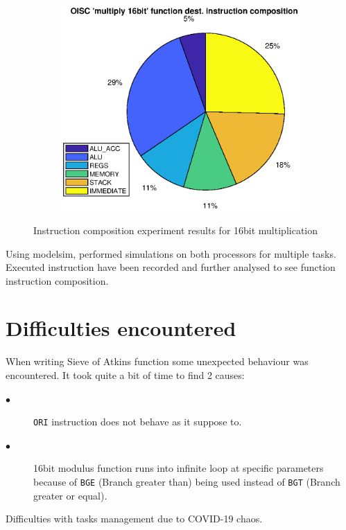 \documentclass[a4paper,12pt]{article}
\begin{document}
\begin{figure}[b!]
\begin{subfigure}[b]{0.3\textwidth}
		\includegraphics[width=1.3\textwidth]{../tests/oisc_mul16_dst_comp.eps}
		\caption{}
		\label{fig:t2}
	\end{subfigure}
	\caption{Instruction composition experiment results for 16bit multiplication}\label{fig:t}
\end{figure}

Using modelsim, performed simulations on both processors for multiple tasks. Executed instruction have been recorded and further analysed to see function instruction composition.



\pagebreak


\section{Difficulties encountered}
When writing Sieve of Atkins function some unexpected behaviour was encountered. It took quite a bit of time to find 2 causes:
\begin{description}
	\item[$\bullet$] \texttt{ORI} instruction does not behave as it suppose to.
	\item[$\bullet$] 16bit modulus function runs into infinite loop at specific parameters because of \texttt{BGE} (Branch greater than) being used instead of \texttt{BGT} (Branch greater or equal).
\end{description}

Difficulties with tasks management due to COVID-19 chaos.
\end{document}
